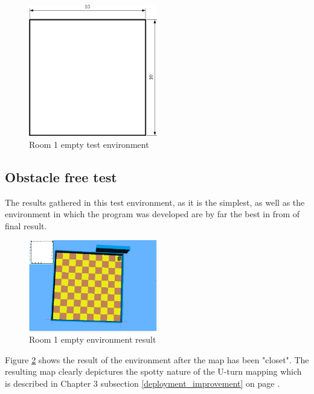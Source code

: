 \begin{figure}[h]
\centering
\includegraphics[width = 0.5\textwidth]{../../figures/room1_empty.png}
\caption{Room 1 empty test environment}
\label{room1_empty}
\end{figure}

\subsection{Obstacle free test}

The results gathered in this test environment, as it is the simplest, as well as the environment in which the program was developed are by far the best in from of final result. \\

\begin{figure}[h]
\centering
\includegraphics[width = 0.5\textwidth]{../../figures/map_results/result_room1_empty.png}
\caption{Room 1 empty environment result}
\label{room1_empty_result}
\end{figure}

Figure \ref{room1_empty_result} shows the result of the environment after the map has been "closet". The resulting map clearly depictures the spotty nature of the U-turn mapping which is described in Chapter 3 subsection \ref{deployment_improvement} on page \pageref{deployment_improvement} . \\[3ex]

